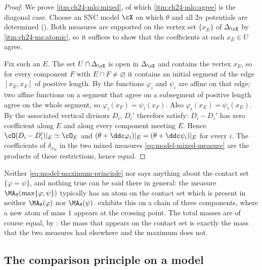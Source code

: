 \begin{proof}
We prove \cref{itm:ch24-mlo:mixed}, of which \cref{itm:ch24-mlo:agree} is the
diagonal case.  Choose an SNC model \(\cX\) on which \(\theta\) and all
\(2n\) potentials are determined ().  Both measures
are supported on the vertex set \(\{x_E\}\) of \(\Delta_{\cX}\) by
\,\cref{itm:ch24-ms:atomic}, so it suffices to
show that the coefficients at each \(x_E\in U\) agree.

Fix such an \(E\).  The set \(U\cap\Delta_{\cX}\) is open in
\(\Delta_{\cX}\) and contains the vertex \(x_E\), so for every component
\(F\) with \(E\cap F\neq\varnothing\) it contains an initial segment of the
edge \([x_E,x_F]\) of positive length.  By
 the functions \(\varphi_i\) and
\(\psi_i\) are affine on that edge; two affine functions on a segment that
agree on a subsegment of positive length agree on the whole segment, so
\(\varphi_i(x_F)=\psi_i(x_F)\).  Also \(\varphi_i(x_E)=\psi_i(x_E)\).  By
 the associated vertical divisors
\(D_i\), \(D_i'\) therefore satisfy: \(D_i-D_i'\) has zero coefficient along
\(E\) and along every component meeting \(E\).  Hence
\(\cO(D_i-D_i')|_E\simeq\cO_E\) and
\((\theta+\ddc\varphi_i)|_E=(\theta+\ddc\psi_i)|_E\) for every \(i\).  The
coefficients of \(\delta_{x_E}\) in the two mixed measures
\eqref{eq:model-mixed-measure} are the products of these restrictions,
hence equal.
\end{proof}

\begin{remark}
\label{rem:ch24-contact-mass}
Neither \eqref{eq:model-maximum-principle} nor
 says anything about the contact set
\(\{\varphi=\psi\}\), and nothing true can be said there in general: the
measure \(\MA_\theta(\max\{\varphi,\psi\})\) typically has an atom on the
contact set which is present in neither \(\MA_\theta(\varphi)\) nor
\(\MA_\theta(\psi)\).   exhibits this on a
chain of three components, where a new atom of mass \(1\) appears at the
crossing point.  The total masses are of course equal, by
: the mass that appears on the contact set is exactly
the mass that the two measures had elsewhere and the maximum does not.
\end{remark}

\subsection{The comparison principle on a model}
\label{sec:ch24-model-comparison}

